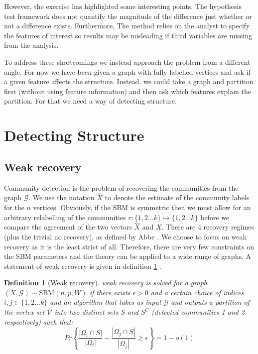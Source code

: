 \documentclass[11pt]{article}
\newcommand{\Gcal}{\mathcal{G}}
\newcommand{\Vcal}{\mathcal{V}}
\newtheorem{definition}{Definition}[section]
\begin{document}
\begin{multicols*}{2}
However, the exercise has highlighted some interesting points. The hypothesis test framework does not quantify the magnitude of the difference just whether or not a difference exists. Furthermore, The method relies on the analyst to specify the features of interest so results may be misleading if third variables are missing from the analysis.

To address these shortcomings we instead approach the problem from a different angle. For now we have been given a graph with fully labelled vertices and ask if a given feature affects the structure. Instead, we could take a graph and partition first (without using feature information) and then ask which features explain the partition. For that we need a way of detecting structure.

\section{Detecting Structure}
\subsection{Weak recovery}

Community detection is the problem of recovering the communities from the graph $\Gcal$. We use the notation $\hat{X}$ to denote the estimate of the community labels for the $n$ vertices. Obviously, if the SBM is symmetric then we must allow for an arbitrary relabelling of the communities $r: \{1, 2 \dots k\} \mapsto \{1, 2 \dots k\}$ before we compare the agreement of the two vectors $\hat{X}$ and $X$. There are 4 recovery regimes (plus the trivial no recovery), as defined by Abbe \cite{Abbe}. We choose to focus on weak recovery as it is the least strict of all. Therefore, there are very few constraints on the SBM parameters and the theory can be applied to a wide range of graphs. A statement of weak recovery is given in definition \ref{defn:weak-recovery} \cite{Abbe}.

\begin{definition}[Weak recovery]
	\label{defn:weak-recovery}
	weak recovery is solved for a graph  $(X, \Gcal) \sim \textrm{SBM}(n, p, W)$ if there exists $\epsilon > 0$ and a certain choice of indices $i, j \in \{1, 2 \dots k\}$ and an algorithm that takes as input $\Gcal$ and outputs a partition of the vertex set $\Vcal$ into two distinct sets $S$ and $S^C$ (detected communities 1 and 2 respectively) such that:
	\begin{equation*}
		Pr\left\{ \frac{|\Omega_i \cap S|}{|\Omega_i|} - \frac{|\Omega_j \cap S|}{|\Omega_j|} \geq \epsilon \right\} = 1 - o(1)
	\end{equation*}


\end{definition}
\end{multicols*}
\end{document}
